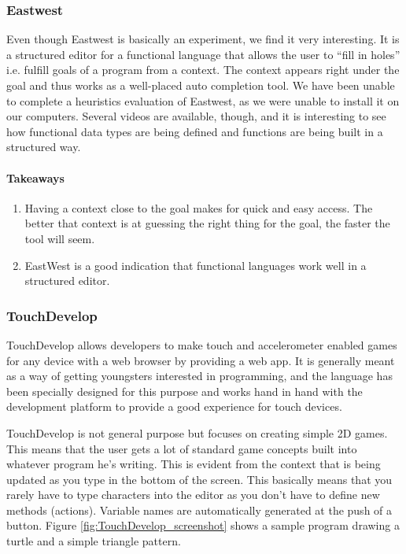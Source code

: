 \subsubsection{Eastwest}
\label{subsub:Eastwest}
Even though Eastwest is basically an experiment, we find it very interesting. It is a structured editor for a functional language that allows the user to ``fill in holes'' i.e. fulfill goals of a program from a context. The context appears right under the goal and thus works as a well-placed auto completion tool. We have been unable to complete a heuristics evaluation of Eastwest, as we were unable to install it on our computers. Several videos are available, though, and it is interesting to see how functional data types are being defined and functions are being built in a structured way. 

\paragraph{Takeaways}
\begin{enumerate}
	\item Having a context close to the goal makes for quick and easy access. The better that context is at guessing the right thing for the goal, the faster the tool will seem.
	\item EastWest is a good indication that functional languages work well in a structured editor.
\end{enumerate}


\subsubsection{TouchDevelop}
\label{subsub:TouchDevelop}
TouchDevelop allows developers to make touch and accelerometer enabled games for any device with a web browser by providing a web app. It is generally meant as a way of getting youngsters interested in programming, and the language has been specially designed for this purpose and works hand in hand with the development platform to provide a good experience for touch devices.

TouchDevelop is not general purpose but focuses on creating simple 2D games. This means that the user gets a lot of standard game concepts built into whatever program he's writing. This is evident from the context that is being updated as you type in the bottom of the screen. This basically means that you rarely have to type characters into the editor as you don't have to define new methods (actions). Variable names are automatically generated at the push of a button.
Figure \ref{fig:TouchDevelop_screenshot} shows a sample program drawing a
turtle and a simple triangle pattern.


